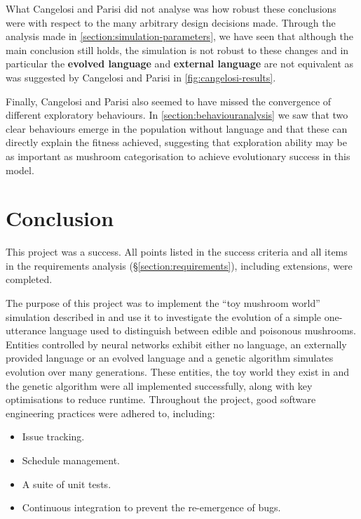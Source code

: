 \documentclass[12pt,a4paper]{report}
\begin{document}
What Cangelosi and Parisi did not analyse was how robust these conclusions were with respect to the many arbitrary design decisions made. Through the analysis made in \cref{section:simulation-parameters}, we have seen that although the main conclusion still holds, the simulation is not robust to these changes and in particular the {\bf evolved language} and {\bf external language} are not equivalent as was suggested by Cangelosi and Parisi in \cref{fig:cangelosi-results}.

Finally, Cangelosi and Parisi also seemed to have missed the convergence of different exploratory behaviours. In \cref{section:behaviouranalysis} we saw that two clear behaviours emerge in the population without language and that these can directly explain the fitness achieved, suggesting that exploration ability may be as important as mushroom categorisation to achieve evolutionary success in this model.


\chapter{Conclusion}

This project was a success. All points listed in the success criteria and all items in the requirements analysis (\S\ref{section:requirements}), including extensions, were completed.

The purpose of this project was to implement the ``toy mushroom world'' simulation described in \citet{Cangelosi1998} and use it to investigate the evolution of a simple one-utterance language used to distinguish between edible and poisonous mushrooms. Entities controlled by neural networks exhibit either no language, an externally provided language or an evolved language and a genetic algorithm simulates evolution over many generations. These entities, the toy world they exist in and the genetic algorithm were all implemented successfully, along with key optimisations to reduce runtime. Throughout the project, good software engineering practices were adhered to, including:
\begin{itemize}
    \item Issue tracking.
    \item Schedule management.
    \item A suite of unit tests.
    \item Continuous integration to prevent the re-emergence of bugs.
\end{itemize}
\end{document}
